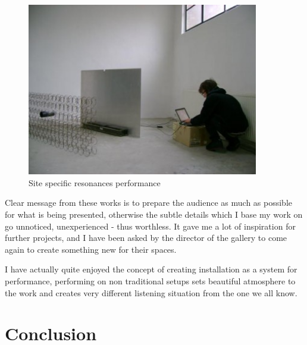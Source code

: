 \documentclass[12pt,a4paper,oneside]{report}
\begin{document}
\begin{figure}  
  \centering
    \includegraphics[width=0.9\textwidth]{img/sitespec}
	\caption{Site specific resonances performance}
	\label{fig:sitespec}
\end{figure}

Clear message from these works is to prepare the audience as much as possible for what is being presented, otherwise the subtle details which I base my work on go unnoticed, unexperienced - thus worthless. It gave me a lot of inspiration for further projects, and I have been asked by the director of the gallery to come again to create something new for their spaces.

I have actually quite enjoyed the concept of creating installation as a system for performance, performing on non traditional setups sets beautiful atmosphere to the work and creates very different listening situation from the one we all know. 


\chapter{Conclusion}

 

\end{document}
